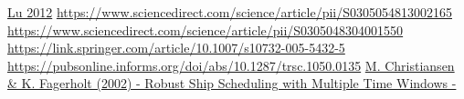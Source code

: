\documentclass[a4paper,12pt]{article}
\begin{document}
\href{http://www-bcf.usc.edu/~maged/publications/MultiplePickup.pdf}{Lu 2012} \newline
\url{https://www.sciencedirect.com/science/article/pii/S0305054813002165} \newline
\url{https://www.sciencedirect.com/science/article/pii/S0305048304001550} \newline
\url{https://link.springer.com/article/10.1007/s10732-005-5432-5} \newline
\url{https://pubsonline.informs.org/doi/abs/10.1287/trsc.1050.0135} \newline
\href{https://onlinelibrary.wiley.com/doi/epdf/10.1002/nav.10033}{M. Christiansen \& K. Fagerholt (2002) - Robust Ship Scheduling with Multiple Time Windows - } \newline
\end{document}
